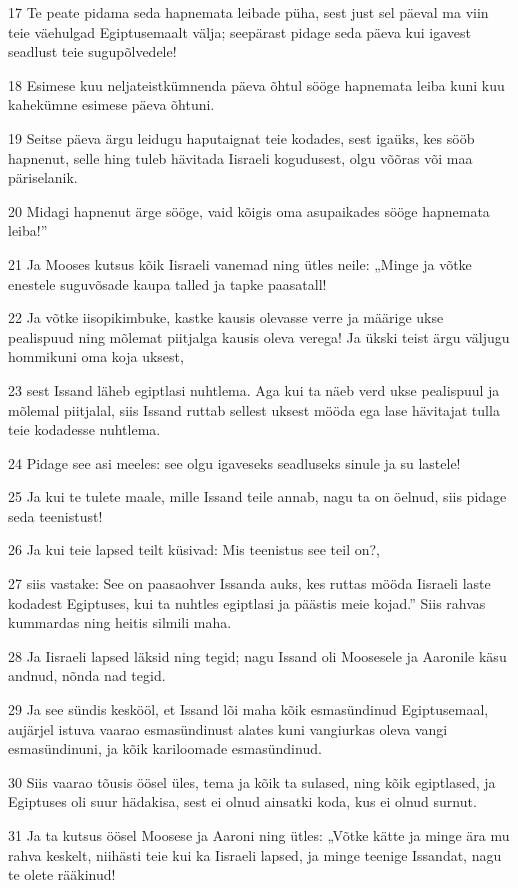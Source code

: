 \par 17 Te peate pidama seda hapnemata leibade püha, sest just sel päeval ma viin teie väehulgad Egiptusemaalt välja; seepärast pidage seda päeva kui igavest seadlust teie sugupõlvedele!
\par 18 Esimese kuu neljateistkümnenda päeva õhtul sööge hapnemata leiba kuni kuu kahekümne esimese päeva õhtuni.
\par 19 Seitse päeva ärgu leidugu haputaignat teie kodades, sest igaüks, kes sööb hapnenut, selle hing tuleb hävitada Iisraeli kogudusest, olgu võõras või maa päriselanik.
\par 20 Midagi hapnenut ärge sööge, vaid kõigis oma asupaikades sööge hapnemata leiba!”
\par 21 Ja Mooses kutsus kõik Iisraeli vanemad ning ütles neile: „Minge ja võtke enestele suguvõsade kaupa talled ja tapke paasatall!
\par 22 Ja võtke iisopikimbuke, kastke kausis olevasse verre ja määrige ukse pealispuud ning mõlemat piitjalga kausis oleva verega! Ja ükski teist ärgu väljugu hommikuni oma koja uksest,
\par 23 sest Issand läheb egiptlasi nuhtlema. Aga kui ta näeb verd ukse pealispuul ja mõlemal piitjalal, siis Issand ruttab sellest uksest mööda ega lase hävitajat tulla teie kodadesse nuhtlema.
\par 24 Pidage see asi meeles: see olgu igaveseks seadluseks sinule ja su lastele!
\par 25 Ja kui te tulete maale, mille Issand teile annab, nagu ta on öelnud, siis pidage seda teenistust!
\par 26 Ja kui teie lapsed teilt küsivad: Mis teenistus see teil on?,
\par 27 siis vastake: See on paasaohver Issanda auks, kes ruttas mööda Iisraeli laste kodadest Egiptuses, kui ta nuhtles egiptlasi ja päästis meie kojad.” Siis rahvas kummardas ning heitis silmili maha.
\par 28 Ja Iisraeli lapsed läksid ning tegid; nagu Issand oli Moosesele ja Aaronile käsu andnud, nõnda nad tegid.
\par 29 Ja see sündis keskööl, et Issand lõi maha kõik esmasündinud Egiptusemaal, aujärjel istuva vaarao esmasündinust alates kuni vangiurkas oleva vangi esmasündinuni, ja kõik kariloomade esmasündinud.
\par 30 Siis vaarao tõusis öösel üles, tema ja kõik ta sulased, ning kõik egiptlased, ja Egiptuses oli suur hädakisa, sest ei olnud ainsatki koda, kus ei olnud surnut.
\par 31 Ja ta kutsus öösel Moosese ja Aaroni ning ütles: „Võtke kätte ja minge ära mu rahva keskelt, niihästi teie kui ka Iisraeli lapsed, ja minge teenige Issandat, nagu te olete rääkinud!
